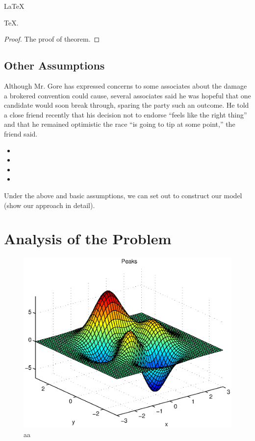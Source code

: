     \begin{Theorem} \label{thm:latex}
    \LaTeX
    \end{Theorem}
    \begin{Lemma} \label{thm:tex}
    \TeX .
    \end{Lemma}
    \begin{proof}
    The proof of theorem.
    \end{proof}






\subsection{Other Assumptions}
Although Mr. Gore has expressed concerns to some associates about
the damage a brokered convention could cause, several associates
said he was hopeful that one candidate would soon break through,
sparing the party such an outcome. He told a close friend recently
that his decision not to endorse “feels like the right thing”
and that he remained optimistic the race “is going to tip at some
point,” the friend said.
\begin{itemize}
\item
\item
\item
\item
\end{itemize}

 Under the above and basic assumptions, we can set out
to construct our model (show our approach in detail).
\section{Analysis of the Problem }
\begin{figure}[h]
\small
\centering
\includegraphics[width=12cm]{./picture/aaa.eps}
\caption{aa} \label{fig:aa}
\end{figure}

